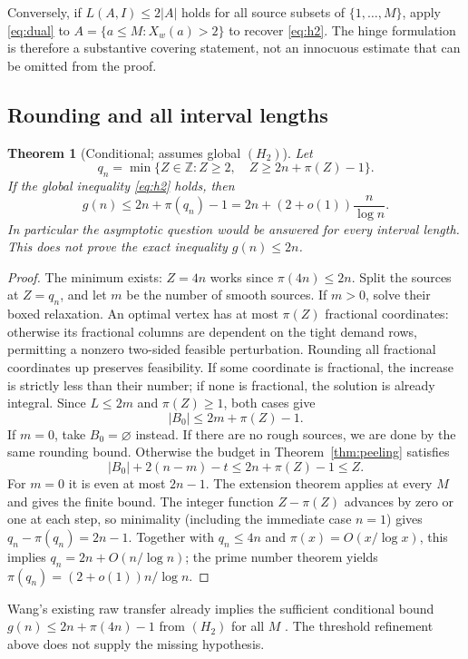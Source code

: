 \documentclass[11pt,a4paper]{article}
\newtheorem{theorem}{Theorem}[section]
\theoremstyle{remark}
\begin{document}
Conversely, if $L(A,I)\le2|A|$ holds for all source subsets of
$\{1,\ldots,M\}$, apply \eqref{eq:dual} to
$A=\{a\le M:X_w(a)>2\}$ to recover \eqref{eq:h2}.
The hinge formulation is therefore a substantive covering statement,
not an innocuous estimate that can be omitted from the proof.

\subsection{Rounding and all interval lengths}
\begin{theorem}[Conditional; assumes global $(H_2)$]\label{thm:conditional}
Let
\[
 q_n=\min\{Z\in\mathbb Z:Z\ge2,\quad Z\ge2n+\pi(Z)-1\}.
\]
If the global inequality \eqref{eq:h2} holds, then
\[
 g(n)\le 2n+\pi(q_n)-1
       =2n+(2+o(1))\frac{n}{\log n}.
\]
In particular the asymptotic question would be answered for every
interval length. This does not prove the exact inequality $g(n)\le2n$.
\end{theorem}
\begin{proof}
The minimum exists: $Z=4n$ works since $\pi(4n)\le2n$.
Split the sources at $Z=q_n$, and let $m$ be the number of smooth
sources. If $m>0$, solve their boxed relaxation. An optimal vertex has
at most $\pi(Z)$ fractional coordinates: otherwise its fractional
columns are dependent on the tight demand rows, permitting a nonzero
two-sided feasible perturbation. Rounding all fractional coordinates up
preserves feasibility. If some coordinate is fractional, the increase
is strictly less than their number; if none is fractional, the solution
is already integral. Since $L\le2m$ and $\pi(Z)\ge1$, both cases give
\[
 |B_0|\le2m+\pi(Z)-1.
\]
If $m=0$, take $B_0=\varnothing$ instead. If there are no rough sources,
we are done by the same rounding bound. Otherwise the budget in
Theorem~\ref{thm:peeling} satisfies
\[
 |B_0|+2(n-m)-t\le2n+\pi(Z)-1\le Z.
\]
For $m=0$ it is even at most $2n-1$. The extension theorem applies at
every $M$ and gives the finite bound. The integer function $Z-\pi(Z)$
advances by zero or one at each step, so minimality (including the
immediate case $n=1$) gives $q_n-\pi(q_n)=2n-1$.
Together with $q_n\le4n$ and $\pi(x)=O(x/\log x)$, this implies
$q_n=2n+O(n/\log n)$; the prime number
theorem yields $\pi(q_n)=(2+o(1))n/\log n$.
\end{proof}

Wang's existing raw transfer already implies the sufficient conditional
bound $g(n)\le2n+\pi(4n)-1$ from $(H_2)$ for all $M$ \cite{wang}.
The threshold refinement above does not supply the missing hypothesis.
\end{document}
